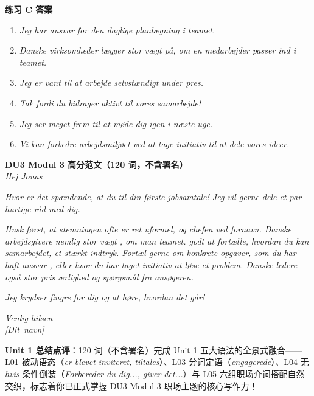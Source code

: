 \begin{answerbox}
\textbf{练习 C 答案}
\begin{enumerate}
  \item \textit{Jeg har ansvar for den daglige planlægning i teamet.}
  \item \textit{Danske virksomheder lægger stor vægt på, om en medarbejder passer ind i teamet.}
  \item \textit{Jeg er vant til at arbejde selvstændigt under pres.}
  \item \textit{Tak fordi du bidrager aktivt til vores samarbejde!}
  \item \textit{Jeg ser meget frem til at møde dig igen i næste uge.}
  \item \textit{Vi kan forbedre arbejdsmiljøet ved at tage initiativ til at dele vores ideer.}
\end{enumerate}

\textbf{DU3 Modul 3 高分范文（120 词，不含署名）}\\
\textit{Hej Jonas}

\textit{Hvor er det spændende, at du  til din første jobsamtale! Jeg vil gerne dele et par hurtige råd med dig.}

\textit{Husk først, at stemningen ofte er ret uformel, og chefen  ved fornavn. Danske arbejdsgivere  nemlig stor vægt , om man   teamet.  godt  at fortælle, hvordan du kan   samarbejdet,  et stærkt indtryk. Fortæl gerne om konkrete opgaver, som du har haft ansvar , eller hvor du har taget initiativ  at løse et problem. Danske ledere  også stor pris  ærlighed og  spørgsmål fra ansøgeren.}

\textit{Jeg krydser fingre for dig og   at høre, hvordan det går!}

\textit{Venlig hilsen\\
\mbox{[Dit navn]}}

\small\textbf{Unit 1 总结点评}：120 词（不含署名）完成 Unit 1 五大语法的全景式融合——L01 被动语态（\textit{er blevet inviteret, tiltales}）、L03 分词定语（\textit{engagerede}）、L04 无 \textit{hvis} 条件倒装（\textit{Forbereder du dig..., giver det...}）与 L05 六组职场介词搭配自然交织，标志着你已正式掌握 DU3 Modul 3 职场主题的核心写作力！
\end{answerbox}
